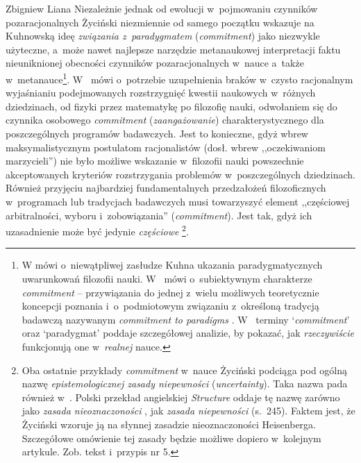 \begin{artplenv}{Zbigniew Liana}
Niezależnie jednak od ewolucji w~pojmowaniu czynników pozaracjonalnych Życiński niezmiennie od samego początku wskazuje
na Kuhnowską ideę \textit{związania z~paradygmatem }(\textit{commitment}) jako niezwykle użyteczne, a~może nawet najlepsze
narzędzie metanaukowej interpretacji faktu nieuniknionej obecności czynników
pozaracjonalnych w~nauce a~także w~metanauce\footnote{W
\parencite[s.~153]{zycinski_jezyk_1983}
mówi o~niewątpliwej
zasłudze Kuhna ukazania paradygmatycznych uwarunkowań filozofii nauki.
W~\parencite[s.~160]{zycinski_teizm_1985}
mówi o~subiektywnym charakterze \textit{commitment} -- przywiązania do jednej z~wielu możliwych
teoretycznie koncepcji poznania i~o~podmiotowym związaniu z~określoną tradycją badawczą nazywanym \textit{commitment to
paradigms}
\parencite*[s.~164]{zycinski_teizm_1985}.
W~\parencite[s.~191–200]{zycinski_elementy_1996}
terminy `\textit{commitment}' oraz `paradygmat' poddaje szczegółowej analizie, by pokazać, jak
\textit{rzeczywiście} funkcjonują one w~\textit{realnej} nauce.}.
W~\parencites[s.~136n]{zycinski_structure_1988}[s.~241n]{zycinski_struktura_2013}
mówi o~potrzebie uzupełnienia braków w~czysto racjonalnym wyjaśnianiu
podejmowanych rozstrzygnięć kwestii naukowych w~różnych dziedzinach, od fizyki przez matematykę po filozofię nauki,
odwołaniem się do czynnika osobowego \textit{commitment} (\textit{zaangażowanie}) charakterystycznego dla poszczególnych
programów badawczych. Jest to konieczne, gdyż wbrew maksymalistycznym postulatom racjonalistów (dosł. wbrew
,,oczekiwaniom marzycieli'') nie było możliwe wskazanie w~filozofii nauki powszechnie akceptowanych kryteriów
rozstrzygania problemów w~poszczególnych dziedzinach. Również przyjęciu najbardziej fundamentalnych przedzałożeń
filozoficznych w~programach lub tradycjach badawczych musi towarzyszyć element ,,częściowej arbitralności,
wyboru i~zobowiązania'' (\textit{commitment}).
Jest tak, gdyż ich uzasadnienie może być jedynie \textit{częściowe}
\parencites[zob.][s.~143]{zycinski_structure_1988}[s.~253n]{zycinski_struktura_2013}\footnote{Oba
ostatnie przykłady \textit{commitment} w~nauce
Życiński podciąga pod ogólną nazwę \textit{epistemologicznej zasady niepewności} (\textit{uncertainty}). Taka nazwa pada
również w~\parencite[s.~159]{zycinski_teizm_1985}.
Polski przekład angielskiej
\textit{Structure} oddaje tę nazwę zarówno jako \textit{zasada nieoznaczoności}
\parencite[s.~240]{zycinski_struktura_2013},
jak \textit{zasada niepewności}
(s.~245).
Faktem jest, że
Życiński wzoruje ją na słynnej zasadzie nieoznaczoności Heisenberga. Szczegółowe omówienie tej zasady będzie możliwe
dopiero w~kolejnym artykule. Zob. tekst i~przypis nr 5.}.


\end{artplenv}
